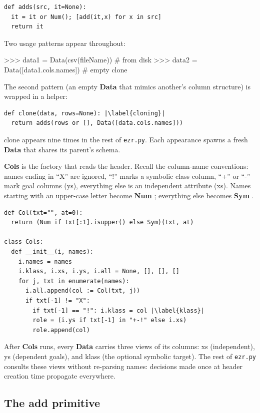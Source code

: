 \documentclass[AMA,STIX2COL]{WileyNJDv5}
\newcommand{\cls}[1]{%
  \setlength{\fboxsep}{1.5pt}%
  \colorbox{clsbg}{\sffamily\bfseries{#1}}%
}
\begin{document}
{\begin{verbatim}
def adds(src, it=None):
  it = it or Num(); [add(it,x) for x in src]
  return it
\end{verbatim}
Two usage patterns appear throughout:
\begin{repl}
>>> data1 = Data(csv(fileName))           # from disk
>>> data2 = Data([data1.cols.names])      # empty clone
\end{repl}
The second pattern (an empty \cls{Data} that mimics another's
column structure) is wrapped in a helper:
\begin{verbatim}
def clone(data, rows=None): |\label{cloning}|
  return adds(rows or [], Data([data.cols.names]))
\end{verbatim}
\textsf{clone} appears nine times in the rest of
\texttt{ezr.py}. Each appearance spawns a fresh \cls{Data} that
shares its parent's schema.

\cls{Cols} is the factory that reads the header. Recall the
column-name conventions: names ending in ``X'' are ignored, ``!''
marks a symbolic class column, ``+'' or ``-'' mark goal columns
(\textsf{ys}), everything else is an independent attribute
(\textsf{xs}). Names starting with an upper-case letter become
\cls{Num}; everything else becomes \cls{Sym}.
\begin{verbatim}
def Col(txt="", at=0):
  return (Num if txt[:1].isupper() else Sym)(txt, at)

class Cols:
  def __init__(i, names):
    i.names = names
    i.klass, i.xs, i.ys, i.all = None, [], [], []
    for j, txt in enumerate(names):
      i.all.append(col := Col(txt, j))
      if txt[-1] != "X":
        if txt[-1] == "!": i.klass = col |\label{klass}|
        role = (i.ys if txt[-1] in "+-!" else i.xs)
        role.append(col)
\end{verbatim}
After \cls{Cols} runs, every \cls{Data} carries three views of
its columns: \textsf{xs} (independent), \textsf{ys} (dependent
goals), and \textsf{klass} (the optional symbolic target). The
rest of \texttt{ezr.py} consults these views without re-parsing
names: decisions made once at header creation time propagate
everywhere.

\subsection{The \textsf{add} primitive}

}
\end{document}
